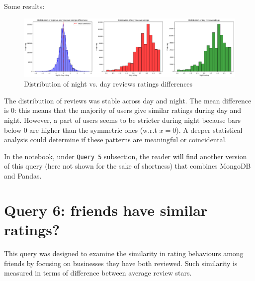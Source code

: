 \documentclass{Configuration_Files/PoliMi3i_thesis}
\begin{document}
\bigskip

Some results:
\bigskip

\begin{figure}[H]
    \centering
    \includegraphics[width=\columnwidth]{imgs/query_5.png}
    \caption{Distribution of night vs. day reviews ratings differences}
    \label{fig:query_5}
\end{figure}

\bigskip

The distribution of reviews was stable across day and night. The mean difference is $0$: this means that the majority of users give similar ratings during day and night. However, a part of users seems to be stricter during night because bars below $0$ are higher than the symmetric ones (w.r.t $x = 0$). A deeper statistical analysis could determine if these patterns are meaningful or coincidental.

In the notebook, under \texttt{Query 5} subsection, the reader will find another version of this query (here not shown for the sake of shortness) that combines MongoDB and Pandas.

\section{Query 6: friends have similar ratings?}
This query was designed to examine the similarity in rating behaviours among friends by focusing on businesses they have both reviewed. Such similarity is measured in terms of difference between average review stars.
\end{document}
